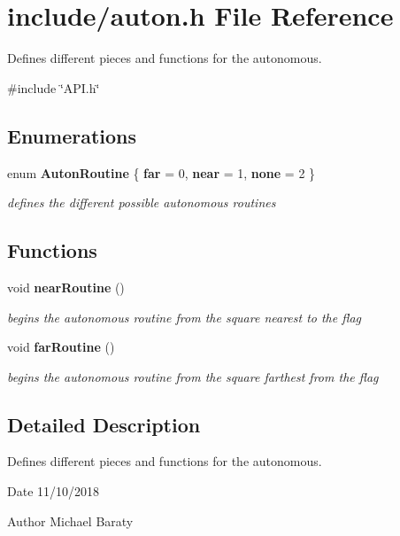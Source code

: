 \section{include/auton.h File Reference}
\label{auton_8h}


Defines different pieces and functions for the autonomous.  


{\ttfamily \#include \char`\"{}A\+P\+I.\+h\char`\"{}}\newline
\subsection*{Enumerations}
\begin{DoxyCompactItemize}
\item 
enum \textbf{ Auton\+Routine} \{ \textbf{ far} = 0, 
\textbf{ near} = 1, 
\textbf{ none} = 2
 \}
\begin{DoxyCompactList}\small\item\em defines the different possible autonomous routines \end{DoxyCompactList}\end{DoxyCompactItemize}
\subsection*{Functions}
\begin{DoxyCompactItemize}
\item 
void \textbf{ near\+Routine} ()
\begin{DoxyCompactList}\small\item\em begins the autonomous routine from the square nearest to the flag \end{DoxyCompactList}\item 
void \textbf{ far\+Routine} ()
\begin{DoxyCompactList}\small\item\em begins the autonomous routine from the square farthest from the flag \end{DoxyCompactList}\end{DoxyCompactItemize}


\subsection{Detailed Description}
Defines different pieces and functions for the autonomous. 

\begin{DoxyDate}{Date}
11/10/2018 
\end{DoxyDate}
\begin{DoxyAuthor}{Author}
Michael Baraty 
\end{DoxyAuthor}


